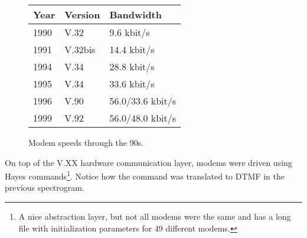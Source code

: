  \begin{figure}[H]
\centering  
\begin{tabularx}{\textwidth}{ L{0.2} L{0.3} L{0.5}}
  \toprule
  \textbf{Year} & \textbf{Version} & \textbf{Bandwidth} \\
  \toprule 
   
    1990 & V.32 & 9.6 kbit/s \\
    1991 & V.32bis &  14.4 kbit/s \\
    1994 & V.34 & 28.8 kbit/s \\
    1995 & V.34 & 33.6 kbit/s \\
    1996 & V.90 & 56.0/33.6 kbit/s\\
    1999 & V.92 & 56.0/48.0 kbit/s\\
   
   \toprule
\end{tabularx}
\caption{Modem speeds through the 90s.\protect\footnotemark}
\end{figure}


\par
On top of the V.XX hardware communication layer, modems were driven using Hayes commands\footnote{A nice abstraction layer, but not   all modems were the same and \doom{} has a long file with initialization parameters for 49 different modems.}. Notice how the command  was translated to DTMF in the previous spectrogram.\\%

